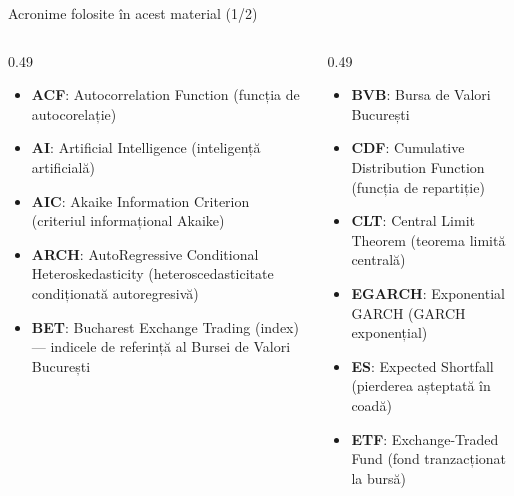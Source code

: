 \providecommand{\sfmapplink}[3]{\hypertarget{#2}{}\hyperlink{#1}{\beamergotobutton{#3}}}  %
\providecommand{\sfmappback}[2]{\begin{tikzpicture}[remember picture,overlay]\node[anchor=south east] at ([xshift=-3mm,yshift=7mm]current page.south east){\hyperlink{#1}{\beamerreturnbutton{#2}}};\end{tikzpicture}}  %
\providecommand{\sfmchlink}[2]{\href{#1}{#2}}  %
\providecommand{\sfmchlinkt}[2]{\href{#1}{\usebeamercolor[fg]{frametitle}#2}}  %


{
\begin{frame}[noframenumbering]
    \titlepage
\end{frame}
}
\begin{frame}{Acronime folosite în acest material (1/2)}
\begin{columns}[T]
\begin{column}{0.49\textwidth}
\begin{itemize}\setlength{\itemsep}{0pt}
    \item \textbf{ACF}: Autocorrelation Function (funcția de autocorelație)
    \item \textbf{AI}: Artificial Intelligence (inteligență artificială)
    \item \textbf{AIC}: Akaike Information Criterion (criteriul informațional Akaike)
    \item \textbf{ARCH}: AutoRegressive Conditional Heteroskedasticity (heteroscedasticitate condiționată autoregresivă)
    \item \textbf{BET}: Bucharest Exchange Trading (index) — indicele de referință al Bursei de Valori București
\end{itemize}
\end{column}
\begin{column}{0.49\textwidth}
\begin{itemize}\setlength{\itemsep}{0pt}
    \item \textbf{BVB}: Bursa de Valori București
    \item \textbf{CDF}: Cumulative Distribution Function (funcția de repartiție)
    \item \textbf{CLT}: Central Limit Theorem (teorema limită centrală)
    \item \textbf{EGARCH}: Exponential GARCH (GARCH exponențial)
    \item \textbf{ES}: Expected Shortfall (pierderea așteptată în coadă)
    \item \textbf{ETF}: Exchange-Traded Fund (fond tranzacționat la bursă)
\end{itemize}
\end{column}
\end{columns}
\end{frame}
